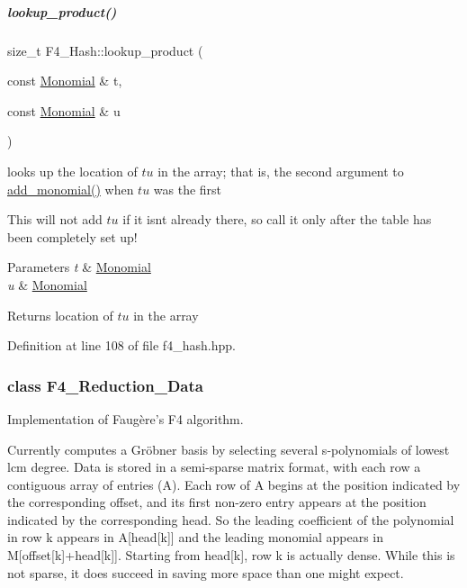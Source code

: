 \mbox{\label{group___g_b_computation_a539f858e09579b9119941795e42cdc4f}} 
\subparagraph{\texorpdfstring{lookup\+\_\+product()}{lookup\_product()}}
{\footnotesize\ttfamily size\+\_\+t F4\+\_\+\+Hash\+::lookup\+\_\+product (\begin{DoxyParamCaption}\item[{const \hyperlink{group__polygroup_class_monomial}{Monomial} \&}]{t,  }\item[{const \hyperlink{group__polygroup_class_monomial}{Monomial} \&}]{u }\end{DoxyParamCaption})\hspace{0.3cm}{\ttfamily [inline]}}



looks up the location of $tu$ in the array; that is, the second argument to {\ttfamily \hyperlink{group___g_b_computation_a86a18244162325e3d792ea39525b23f8}{add\+\_\+monomial()}} when $tu$ was the first 

This will not add $tu$ if it isn\textquotesingle{}t already there, so call it only after the table has been completely set up! 
\begin{DoxyParams}{Parameters}
{\em t} & {\ttfamily \hyperlink{group__polygroup_class_monomial}{Monomial}} \\
\hline
{\em u} & {\ttfamily \hyperlink{group__polygroup_class_monomial}{Monomial}} \\
\hline
\end{DoxyParams}
\begin{DoxyReturn}{Returns}
location of $tu$ in the array 
\end{DoxyReturn}


Definition at line 108 of file f4\+\_\+hash.\+hpp.

\label{class_f4___reduction___data}
\subsubsection{class F4\+\_\+\+Reduction\+\_\+\+Data}
Implementation of Faug\`{e}re's F4 algorithm. 

Currently computes a Gr\"{o}bner basis by selecting several s-\/polynomials of lowest lcm degree. Data is stored in a semi-\/sparse matrix format, with each row a contiguous array of entries ({\ttfamily A}). Each row of {\ttfamily A} begins at the position indicated by the corresponding {\ttfamily offset}, and its first non-\/zero entry appears at the position indicated by the corresponding {\ttfamily head}. So the leading coefficient of the polynomial in row {\ttfamily k} appears in {\ttfamily A\mbox{[}head\mbox{[}k\mbox{]}\mbox{]}} and the leading monomial appears in {\ttfamily M\mbox{[}offset\mbox{[}k\mbox{]}+head\mbox{[}k\mbox{]}\mbox{]}}. Starting from {\ttfamily head\mbox{[}k\mbox{]}}, row {\ttfamily k} is actually dense. While this is not sparse, it does succeed in saving more space than one might expect. 

